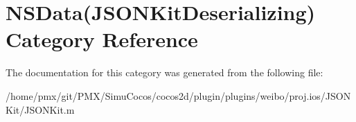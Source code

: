 \hypertarget{categoryNSData_07JSONKitDeserializing_08}{}\section{N\+S\+Data(J\+S\+O\+N\+Kit\+Deserializing) Category Reference}
\label{categoryNSData_07JSONKitDeserializing_08}


The documentation for this category was generated from the following file\+:\begin{DoxyCompactItemize}
\item 
/home/pmx/git/\+P\+M\+X/\+Simu\+Cocos/cocos2d/plugin/plugins/weibo/proj.\+ios/\+J\+S\+O\+N\+Kit/J\+S\+O\+N\+Kit.\+m\end{DoxyCompactItemize}
